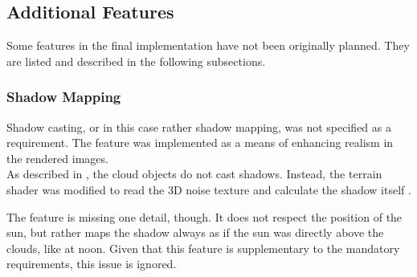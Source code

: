 \clearpage

\subsection{Additional Features}
Some features in the final implementation have not been originally planned.
They are listed and described in the following subsections.

\subsubsection{Shadow Mapping}
Shadow casting, or in this case rather shadow mapping, was not specified as a requirement. The feature was implemented as a means of enhancing realism in the rendered images.
\\
As described in , the cloud objects do not cast shadows.
Instead, the terrain \gls{shader} was modified to read the 3D \gls{noise} texture and calculate the shadow itself .

\begin{figure}[H]
    \centering
    \label{img:results:shadowmapping}
\end{figure}

\noindent
The feature is missing one detail, though.
It does not respect the position of the sun, but rather maps the shadow always as if the sun was directly above the clouds, like at noon.
Given that this feature is supplementary to the mandatory requirements, this issue is ignored.

